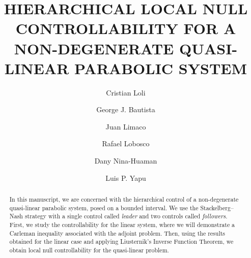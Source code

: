 \documentclass[11pt,a4paper]{amsart}
\numberwithin{equation}{section}
\begin{document}
\title[Hierarchical Controllability ]{HIERARCHICAL LOCAL NULL CONTROLLABILITY
FOR A NON-DEGENERATE QUASI-LINEAR PARABOLIC SYSTEM 
}

\author[Cristian Loli]{Cristian Loli}  
	\address{CRISTIAN LOLI \hfill\break
	Universidade Federal Fluminense, Instituto de Matemática e Estatistica, Brazil.}
\author[George Bautista]{George J. Bautista} 
	\address{GEORGE J. BAUTISTA  \hfill\break
	Universidade Federal Fluminense, Instituto de Matemática e Estatistica, Brazil.}
\author[Juan Limaco]{Juan Limaco}  
	\address{JUAN LIMACO  \hfill\break
	Universidade Federal Fluminense, Instituto de Matemática e Estatistica, Brazil.}
\author[Rafael Lobosco]{Rafael Lobosco} 
	\address{RAFAEL LOBOSCO \hfill\break
	Instituto Federal do Rio de Janeiro, Brazil.}
\author[Dany Nina]{Dany Nina-Huaman} 
    \address{DANY NINA-HUAMAN \hfill\break Universidad Nacional Agraria La  Molina, Peru.}
\author[Luis Yapu]{Luis P. Yapu} 
	\address{LUIS P. YAPU \hfill\break
	Universidade Federal Fluminense, Instituto de Matemática e Estatistica, Brazil\\ \hfill\break
    Chair of Dynamics, Control, Machine Learning and Numerics, Friedrich-Alexander-Universit\"at Erlangen-N\"urnberg, Germany.}






\begin{abstract}
    In this manuscript, we are concerned with  the hierarchical control of a  non-degenerate quasi-linear parabolic system, posed on a bounded interval. We use the Stackelberg–Nash strategy with a single control called  \textit{leader} and two controls called \textit{followers}.  First, we study the controllability for the linear system, where we will demonstrate a Carleman inequality associated with the adjoint problem. Then, using the results obtained for the linear case and applying Liusternik's Inverse Function Theorem, we obtain local null controllability for the quasi-linear problem.
 
\end{abstract}
\end{document}
